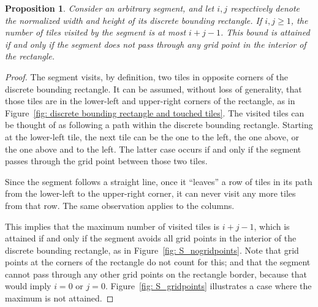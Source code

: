 \documentclass[12pt, a4paper]{article}
\newtheorem{proposition}{Proposition}%
\begin{document}
\begin{proposition}
\label{prop: i+j-1}
Consider an arbitrary segment, and let $i, j$ respectively denote the normalized width and height of its discrete bounding rectangle. If $i, j \geq 1$, the number of tiles visited by the segment is at most $i+j-1$. This bound is attained if and only if the segment does not pass through any grid point in the interior of the rectangle.
\end{proposition}

\begin{proof}
The segment visits, by definition, two tiles in opposite corners of the discrete bounding rectangle. It can be assumed, without loss of generality, that those tiles are in the lower-left and upper-right corners of the rectangle, as in Figure~\ref{fig: discrete bounding rectangle and touched tiles}. The visited tiles can be thought of as following a path within the discrete bounding rectangle. Starting at the lower-left tile, the next tile can be the one to the left, the one above, or the one above and to the left. The latter case occurs if and only if the segment passes through the grid point between those two tiles.

Since the segment follows a straight line, once it ``leaves'' a row of tiles in its path from the lower-left to the upper-right corner, it can never visit any more tiles from that row. The same observation applies to the columns.

This implies that the maximum number of visited tiles is $i+j-1$, which is attained if and only if the segment avoids all grid points in the interior of the discrete bounding rectangle, as in Figure~\ref{fig: S_nogridpoints}. Note that grid points at the corners of the rectangle do not count for this; and that the segment cannot pass through any other grid points on the rectangle border, because that would imply $i=0$ or $j=0$. Figure~\ref{fig: S_gridpoints} illustrates a case where the maximum is not attained.
\end{proof}
\end{document}
